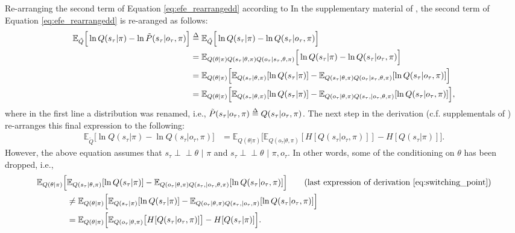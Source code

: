 \documentclass[twoside,11pt]{article}
\makeatletter
\def\delequal{\mathrel{\ensurestackMath{\stackon[1pt]{=}{\scriptstyle\Delta}}}}
\newcommand{\indep}{\perp \! \! \! \perp}
\newcounter{subsubsubsection}[subsubsection]
\def\subsubsubsection{\@startsection
     {subsubsubsection}{4}{\z@} {-3.25ex plus -1
     ex minus -.2ex}{1.5ex plus .2ex}{\normalsize\bf}}
\makeatother
\begin{document}
\subsubsubsection{Re-arranging the second term of Equation \eqref{eq:efe_rearrangedd} according to \citet{DeepAIwithMCMC}}
In the supplementary material of \citep{DeepAIwithMCMC}, the second term of Equation \eqref{eq:efe_rearrangedd} is re-aranged as follows:
\begin{align}
\mathbb{E}_{\tilde{Q}}\Big[ \ln Q(s_\tau|\pi) - \ln \tilde{P}(s_\tau|o_\tau, \pi) \Big] &\delequal \mathbb{E}_{\tilde{Q}}\Big[ \ln Q(s_\tau|\pi) - \ln Q(s_\tau|o_\tau, \pi) \Big]\label{eq:switching_point}\\
&= \mathbb{E}_{Q(\theta|\pi)Q(s_\tau|\theta,\pi)Q(o_\tau|s_\tau,\theta,\pi)}\Big[ \ln Q(s_\tau|\pi) - \ln Q(s_\tau|o_\tau, \pi) \Big]\nonumber\\
&= \mathbb{E}_{Q(\theta|\pi)}\Big[ \mathbb{E}_{Q(s_\tau|\theta,\pi)}[\ln Q(s_\tau|\pi)] - \mathbb{E}_{Q(s_\tau|\theta,\pi)Q(o_\tau|s_\tau,\theta,\pi)}[\ln Q(s_\tau|o_\tau, \pi)] \Big]\nonumber\\
&= \mathbb{E}_{Q(\theta|\pi)}\Big[ \mathbb{E}_{Q(s_\tau|\theta,\pi)}[\ln Q(s_\tau|\pi)] - \mathbb{E}_{Q(o_\tau|\theta,\pi)Q(s_\tau,|o_\tau,\theta,\pi)}[\ln Q(s_\tau|o_\tau, \pi)] \Big],\nonumber
\end{align}
where in the first line a distribution was renamed, i.e., $\tilde{P}(s_\tau|o_\tau, \pi) \delequal Q(s_\tau|o_\tau, \pi)$. The next step in the derivation (c.f. supplementals of \citet{DeepAIwithMCMC}) re-arranges this final expression to the following:
\begin{align*}
\mathbb{E}_{\tilde{Q}}\Big[ \ln Q(s_\tau|\pi) - \ln Q(s_\tau|o_\tau, \pi) \Big] &= \mathbb{E}_{Q(\theta|\pi)}\Big[ \mathbb{E}_{Q(o_\tau|\theta,\pi)}[H[Q(s_\tau|o_\tau, \pi)]] - H[Q(s_\tau|\pi)] \Big].
\end{align*}
However, the above equation assumes that $s_\tau \indep \theta\,\, | \,\,\pi$ and $s_\tau \indep \theta \,\,| \,\,\pi, o_\tau$. In other words, some of the conditioning on $\theta$ has been dropped, i.e.,
\begin{align*}
\mathbb{E}_{Q(\theta|\pi)}\Big[ &\mathbb{E}_{Q(s_\tau|\theta,\pi)}[\ln Q(s_\tau|\pi)] - \mathbb{E}_{Q(o_\tau|\theta,\pi)Q(s_\tau,|o_\tau,\theta,\pi)}[\ln Q(s_\tau|o_\tau, \pi)] \Big] \tag{last expression of derivation \ref{eq:switching_point}}\\
&\neq \mathbb{E}_{Q(\theta|\pi)}\Big[ \mathbb{E}_{Q(s_\tau|\pi)}[\ln Q(s_\tau|\pi)] - \mathbb{E}_{Q(o_\tau|\theta,\pi)Q(s_\tau,|o_\tau,\pi)}[\ln Q(s_\tau|o_\tau, \pi)] \Big] \\
&= \mathbb{E}_{Q(\theta|\pi)}\Big[ \mathbb{E}_{Q(o_\tau|\theta,\pi)}\big[H[Q(s_\tau|o_\tau, \pi)]\big] - H[Q(s_\tau|\pi)] \Big].
\end{align*}
\end{document}
